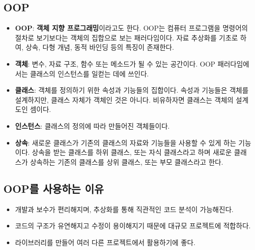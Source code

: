 \subsection{OOP}
\begin{itemize}
	\item \textbf{OOP}: \textbf{객체 지향 프로그래밍}이라고도 한다. OOP는 컴퓨터 프로그램을 명령어의 절차로 보기보다는 객체의 집합으로 보는 패러다임이다. 자료 추상화를 기초로 하여, 상속, 다형 개념, 동적 바인딩 등의 특징이 존재한다.
	\item \textbf{객체}: 변수, 자료 구조, 함수 또는 메소드가 될 수 있는 공간이다. OOP 패러다임에서는 클래스의 인스턴스를 일컫는 데에 쓰인다.
	\item \textbf{클래스}: 객체를 정의하기 위한 속성과 기능들의 집합이다. 속성과 기능들은 객체를 설계하지만, 클래스 자체가 객체인 것은 아니다. 비유하자면 클래스는 객체의 설계도인 셈이다.
	\item \textbf{인스턴스}: 클래스의 정의에 따라 만들어진 객체들이다.
	\item \textbf{상속}: 새로운 클래스가 기존의 클래스의 자료와 기능들을 사용할 수 있게 하는 기능이다. 상속을 받는 클래스를 하위 클래스, 또는 자식 클래스라고 하며 새로운 클래스가 상속하는 기존의 클래스를 상위 클래스, 또는 부모 클래스라고 한다. 
\end{itemize}

\subsection{OOP를 사용하는 이유}
\begin{itemize}
	\item 개발과 보수가 편리해지며, 추상화를 통해 직관적인 코드 분석이 가능해진다.
	\item 코드의 구조가 유연해지고 수정이 용이해지기 때문에 대규모 프로젝트에 적합하다.
	\item 라이브러리를 만들어 여러 다른 프로젝트에서 활용하기에 좋다.
\end{itemize}


